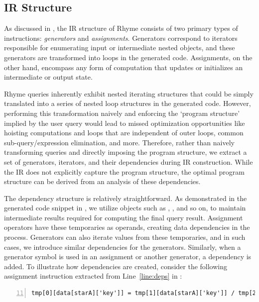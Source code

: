 \documentclass[runningheads]{llncs}
\newcommand{\lang}{Rhyme}
\begin{document}

\subsection{IR Structure}

As discussed in , the IR structure of \lang{} consists of two
primary types of instructions: \emph{generators} and \emph{assignments}.
Generators correspond to iterators responsible for enumerating input or intermediate
nested objects, and these generators are transformed into loops in the generated code.
Assignments, on the other hand, encompass any form of computation that updates or
initializes an intermediate or output state.

\lang{} queries inherently exhibit nested iterating structures that could be simply
translated into a series of nested loop structures in the generated code.
However, performing this transformation naively and enforcing the `program structure'
implied by the user query would lead to missed optimization opportunities like
hoisting computations and loops that are independent of outer loops,
common sub-query/expression elimination, and more.
Therefore, rather than naively transforming queries and directly imposing the program
structure, we extract a set of generators, iterators, and their dependencies during
IR construction.
While the IR does not explicitly capture the program structure, the optimal program
structure can be derived from an analysis of these dependencies.

The dependency structure is relatively straightforward.
As demonstrated in the generated code snippet in , we utilize objects such
as , , and so on, to maintain intermediate results required
for computing the final query result.
Assignment operators have these temporaries as operands, creating data dependencies in the
process.
Generators can also iterate values from these temporaries, and in such cases, we introduce
similar dependencies for the generators.
Similarly, when a generator symbol is used in an assignment or another generator, a
dependency is added.
To illustrate how dependencies are created, consider the following assignment instruction
extracted from Line~\ref{line:deps} in :

\begin{lstlisting}[style=JavaScript, columns=flexible, numbers=left, firstnumber=11]
tmp[0][data[starA]['key']] = tmp[1][data[starA]['key']] / tmp[2]
\end{lstlisting}
\end{document}
